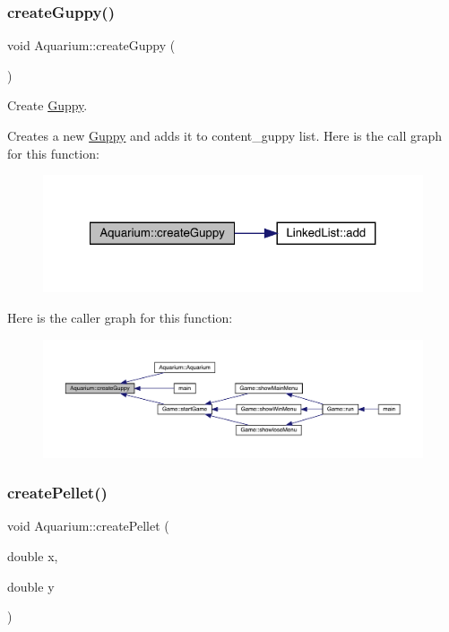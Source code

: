 \subsubsection{\texorpdfstring{create\+Guppy()}{createGuppy()}}
{\footnotesize\ttfamily void Aquarium\+::create\+Guppy (\begin{DoxyParamCaption}{ }\end{DoxyParamCaption})}



Create \mbox{\hyperlink{class_guppy}{Guppy}}. 

Creates a new \mbox{\hyperlink{class_guppy}{Guppy}} and adds it to content\+\_\+guppy list. Here is the call graph for this function\+:\nopagebreak
\begin{figure}[H]
\begin{center}
\leavevmode
\includegraphics[width=321pt]{class_aquarium_a44ab0beff51d6607e0f590270d9066b5_cgraph}
\end{center}
\end{figure}
Here is the caller graph for this function\+:
\nopagebreak
\begin{figure}[H]
\begin{center}
\leavevmode
\includegraphics[width=350pt]{class_aquarium_a44ab0beff51d6607e0f590270d9066b5_icgraph}
\end{center}
\end{figure}
\mbox{\label{class_aquarium_a049ffa77e7bbb68ac031a098c4e635e7}} 
\subsubsection{\texorpdfstring{create\+Pellet()}{createPellet()}}
{\footnotesize\ttfamily void Aquarium\+::create\+Pellet (\begin{DoxyParamCaption}\item[{double}]{x,  }\item[{double}]{y }\end{DoxyParamCaption})}



